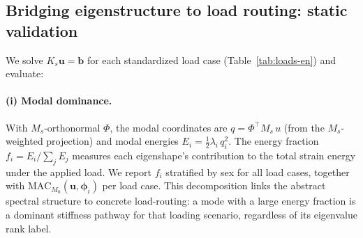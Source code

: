 \documentclass[11pt]{article}
\begin{document}
\subsection{Bridging eigenstructure to load routing: static validation}\label{sec:static}
We solve $K_s\mathbf u=\mathbf b$ for each standardized load case (Table~\ref{tab:loads-en}) and evaluate:

\paragraph{(i) Modal dominance.}
With $M_s$-orthonormal $\Phi$, the modal coordinates are $q=\Phi^\top M_s\, u$ (from the $M_s$-weighted projection) and modal energies $E_i=\tfrac12\lambda_i\,q_i^2$.
The energy fraction $f_i = E_i / \sum_j E_j$ measures each eigenshape's contribution to the total strain energy under the applied load.
We report $f_i$ stratified by sex for all load cases, together with $\mathrm{MAC}_{M_0}(\mathbf u, \boldsymbol\phi_i)$ per load case.
This decomposition links the abstract spectral structure to concrete load-routing: a mode with a large energy fraction is a dominant stiffness pathway for that loading scenario, regardless of its eigenvalue rank label.
\end{document}
